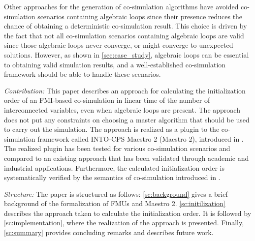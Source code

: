 Other approaches for the generation of co-simulation algorithms have avoided co-simulation scenarios containing algebraic loops since their presence reduces the chance of obtaining a deterministic co-simulation result\cite{Amalio2016CheckingCo-simulation, BromanCompositionCo-Simulation, Gomes2019c}. This choice is driven by the fact that not all co-simulation scenarios containing algebraic loops are valid since those algebraic loops never converge, or might converge to unexpected solutions. However, as shown in \cref{sec:case_study}, algebraic loops can be essential to obtaining valid simulation results, and a well-established co-simulation framework should be able to handle these scenarios. 

\textit{Contribution:} This paper describes an approach for calculating the initialization order of an FMI-based co-simulation in linear time of the number of interconnected variables, even when algebraic loops are present.
The approach does not put any constraints on choosing a master algorithm that should be used to carry out the simulation. 
The approach is realized as a plugin to the co-simulation framework called INTO-CPS Maestro 2 (Maestro 2), introduced in \cite{Thule2019b}.
The realized plugin has been tested for various co-simulation scenarios and compared to an existing approach that has been validated through academic and industrial applications. 
Furthermore, the calculated initialization order is systematically verified by the semantics of co-simulation introduced in \cite{gomes_lucio_vangheluwe_2019,Gomes2019c}. 

\textit{Structure:} The paper is structured as follows: \cref{sc:background} gives a brief background of the formalization of FMUs and Maestro 2. \cref{sc:initilization} describes the approach taken to calculate the initialization order. It is followed by \cref{sc:implementation}, where the realization of the approach is presented. Finally, \cref{sc:summary} provides concluding remarks and describes future work.
